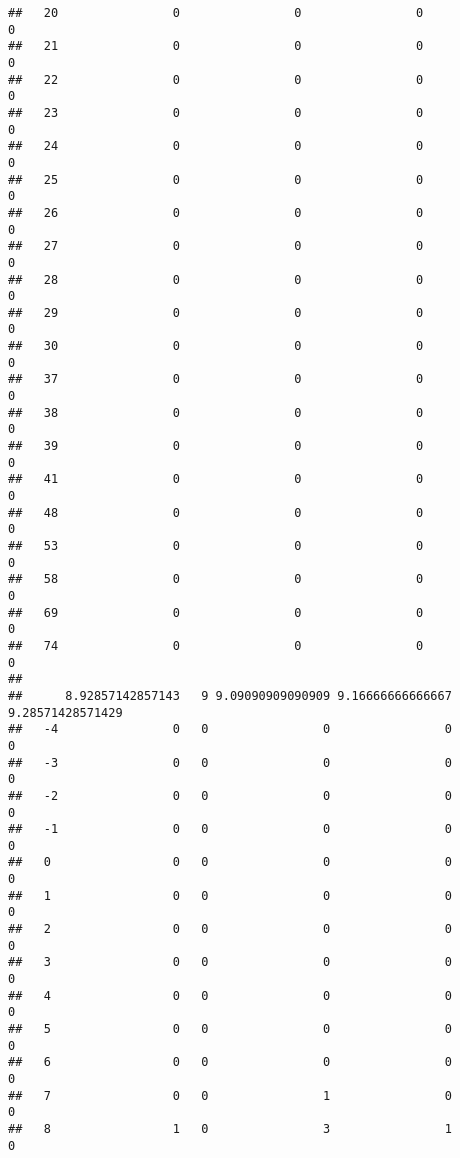 \documentclass[]{article}
\begin{document}
\begin{verbatim}
##   20                0                0                0                0
##   21                0                0                0                0
##   22                0                0                0                0
##   23                0                0                0                0
##   24                0                0                0                0
##   25                0                0                0                0
##   26                0                0                0                0
##   27                0                0                0                0
##   28                0                0                0                0
##   29                0                0                0                0
##   30                0                0                0                0
##   37                0                0                0                0
##   38                0                0                0                0
##   39                0                0                0                0
##   41                0                0                0                0
##   48                0                0                0                0
##   53                0                0                0                0
##   58                0                0                0                0
##   69                0                0                0                0
##   74                0                0                0                0
##     
##      8.92857142857143   9 9.09090909090909 9.16666666666667 9.28571428571429
##   -4                0   0                0                0                0
##   -3                0   0                0                0                0
##   -2                0   0                0                0                0
##   -1                0   0                0                0                0
##   0                 0   0                0                0                0
##   1                 0   0                0                0                0
##   2                 0   0                0                0                0
##   3                 0   0                0                0                0
##   4                 0   0                0                0                0
##   5                 0   0                0                0                0
##   6                 0   0                0                0                0
##   7                 0   0                1                0                0
##   8                 1   0                3                1                0

\end{verbatim}
\end{document}
